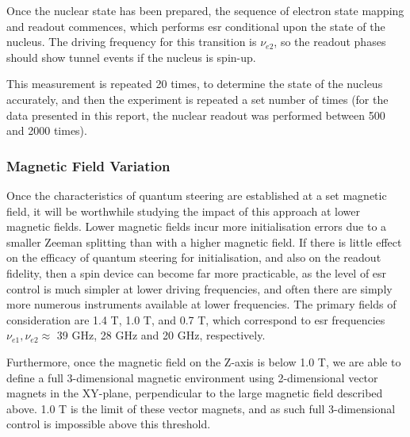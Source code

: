 		Once the nuclear state has been prepared, the sequence of electron state mapping and readout commences, which performs \gls{esr} conditional upon the state of the nucleus. The driving frequency for this transition is $\nu_{e2}$, so the readout phases should show tunnel events if the nucleus is spin-up.
	
		This measurement is repeated 20 times, to determine the state of the nucleus accurately, and then the experiment is repeated a set number of times (for the data presented in this report, the nuclear readout was performed between 500 and 2000 times). 
		
	\subsubsection{Magnetic Field Variation}
		Once the characteristics of quantum steering are established at a set magnetic field, it will be worthwhile studying the impact of this approach at lower magnetic fields. Lower magnetic fields incur more initialisation errors due to a smaller Zeeman splitting than with a higher magnetic field. If there is little effect on the efficacy of quantum steering for initialisation, and also on the readout fidelity, then a spin device can become far more practicable, as the level of \gls{esr} control is much simpler at lower driving frequencies, and often there are simply more numerous instruments available at lower frequencies. The primary fields of consideration are 1.4 T, 1.0 T, and 0.7 T, which correspond to \gls{esr} frequencies  $\nu_{e1}, \nu_{e2} \approx$ 39 GHz, 28 GHz and 20 GHz, respectively.
		
		Furthermore, once the magnetic field on the Z-axis is below 1.0 T, we are able to define a full 3-dimensional magnetic environment using 2-dimensional vector magnets in the XY-plane, perpendicular to the large magnetic field described above. 1.0 T is the limit of these vector magnets, and as such full 3-dimensional control is impossible above this threshold.
		
	